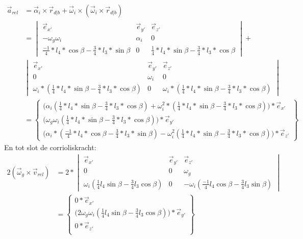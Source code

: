 \documentclass[a4paper,10pt]{article}
\begin{document}
\begin{equation}
	\begin{aligned}
	\vec{a}_{rel} &= \vec{\alpha}_i \times \vec{r}_{d|b} + \vec{\omega}_i \times(\vec{\omega}_i \times \vec{r}_{d|b})\\
	&= \begin{vmatrix}
	\vec{e}_{x'} & \vec{e}_{y'} & \vec{e}_{z'}\\
	-\omega_g\omega_i & \alpha_i & 0 \\
	\frac{-1}{4}*l_4*\cos{\beta} - \frac{3}{4}*l_3 * \sin{\beta} & 0 &\frac{1}{4}*l_4 *\sin{\beta}-\frac{3}{4}*l_3 * \cos{\beta}
	\end{vmatrix} + \\
	&\begin{vmatrix}
	\vec{e}_{x'} & \vec{e}_{y'} & \vec{e}_{z'}\\
	0 & \omega_i & 0 \\
	\omega_i * (\frac{1}{4}*l_4 *\sin{\beta}-\frac{3}{4}*l_3 * \cos{\beta}) & 0 &\omega_i*(\frac{1}{4}*l_4 *\sin{\beta}-\frac{3}{4}*l_3 * \cos{\beta})
	\end{vmatrix}\\
	&= \begin{Bmatrix}
	\Big(\alpha_i(\frac{1}{4}*l_4 *\sin{\beta}-\frac{3}{4}*l_3 * \cos{\beta}) + \omega_i^2*(\frac{1}{4}*l_4 *\sin{\beta}-\frac{3}{4}*l_3 * \cos{\beta})\Big)*\vec{e}_{x'}\\
	\Big(\omega_g\omega_i(\frac{1}{4}*l_4 *\sin{\beta}-\frac{3}{4}*l_3 * \cos{\beta})\Big)*\vec{e}_{y'}\\
	\Big(\alpha_i * (\frac{-1}{4}*l_4*\cos{\beta} - \frac{3}{4}*l_3 * \sin{\beta}) - \omega_i^2(\frac{1}{4}*l_4 *\sin{\beta}-\frac{3}{4}*l_3 * \cos{\beta})\Big)*\vec{e}_{z'}
	\end{Bmatrix}
	\end{aligned}
\end{equation}
En tot slot de corrioliskracht:
\begin{equation}
\begin{aligned}
2(\vec{\omega}_g \times \vec{v}_{rel}) &= 2 * \begin{vmatrix}
\vec{e}_{x'} & \vec{e}_{y'} & \vec{e}_{z'}\\
0 & 0 & \omega_g \\
\omega_i  (\frac{1}{4}l_4 \sin{\beta}-\frac{3}{4}l_3  \cos{\beta}) & 0 & -\omega_i (\frac{-1}{4}l_4\cos{\beta} - \frac{3}{4}l_3  \sin{\beta})
\end{vmatrix}\\
&= \begin{Bmatrix}
0 * \vec{e}_{x'}\\
\Big(2\omega_g\omega_i(\frac{1}{4}l_4 \sin{\beta}-\frac{3}{4}l_3  \cos{\beta})\Big)*\vec{e}_{y'}\\
0 * \vec{e}_{z'}\\
\end{Bmatrix}
\end{aligned}
\end{equation}
\end{document}
